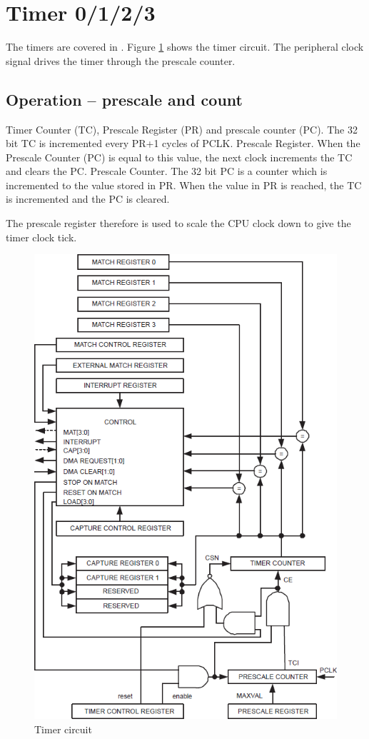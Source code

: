 \documentclass[a4paper]{tufte-handout}
\begin{document}
\section{Timer 0/1/2/3}
The timers are covered in \citep[Chapter 24]{lpc4088}.  
Figure \ref{fig:timer} shows the timer circuit.  The peripheral clock
signal drives the timer through the prescale counter.

\subsection{Operation -- prescale and count}
Timer Counter (TC), Prescale Register (PR) and prescale counter
(PC).  The 32 bit TC is incremented every PR+1 cycles of PCLK.
Prescale Register.  When the Prescale Counter (PC) is equal to this
value, the next clock increments the TC and clears the PC.  Prescale
Counter.  The 32 bit PC is a counter which is incremented to the value
stored in PR.  When the value in PR is reached, the TC is incremented
and the PC is cleared.
 
The prescale register therefore is used to scale the CPU clock down to
give the timer clock tick.
\begin{figure}
  \includegraphics[width=\linewidth]{timercircuit}
  \caption{Timer circuit}
  \label{fig:timer}
\end{figure}
\end{document}
